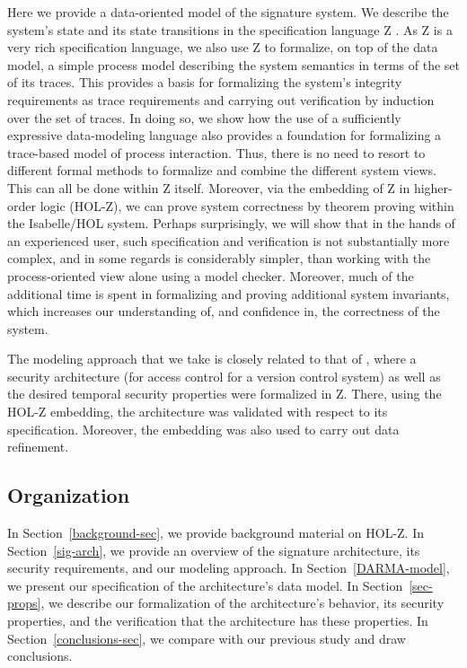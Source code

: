 \documentclass[a4paper,pdftex]{article}
\begin{document}
Here we provide a data-oriented model of the signature
system.  We describe the system's state and its state transitions in the
specification language Z \cite{Zhandbook}.  As Z is a very rich
specification language, we also use Z to formalize, on top of the data
model, a simple process model describing the system semantics in terms
of the set of its traces.  This provides a basis for formalizing the
system's integrity requirements as trace requirements and carrying out
verification by induction over the set of traces.  In doing so, we show
how the use of a sufficiently expressive data-modeling language also
provides a foundation for formalizing a trace-based model of process
interaction.  Thus,  there is no need to resort to
different formal methods to formalize and combine the different system
views. This can all be done within Z itself. Moreover, via the embedding
of Z in higher-order logic (HOL-Z), we can prove system correctness by
theorem proving within the Isabelle/HOL system.  Perhaps surprisingly,
we will show that in the hands of an experienced user, such
specification and verification is not substantially more complex, and in
some regards is considerably simpler, than working with the
process-oriented view alone using a model checker.  Moreover, much of the
additional time is spent in formalizing and proving additional
system invariants, which increases our understanding of, and confidence
in, the correctness of the system.

The modeling approach that we take is closely related to that of
\cite{brucker.ea:verification:2004}, where a security architecture
(for access control for a version control system) as well as the
desired temporal security properties were formalized in Z.  There,
using the HOL-Z embedding, the architecture was validated with respect
to its specification. Moreover, the embedding was also used to carry
out data refinement.

\subsection*{Organization}

In Section~\ref{background-sec}, we provide background material on
HOL-Z.  In Section~\ref{sig-arch}, we provide an overview of the
signature architecture, its security requirements, and our modeling
approach. In Section~\ref{DARMA-model}, we present our specification of
the architecture's data model.  In Section~\ref{sec-props}, we describe
our formalization of the architecture's behavior, its security
properties, and the verification that the architecture has these properties.  In
Section~\ref{conclusions-sec}, we compare with our previous study and
draw conclusions.
\end{document}
